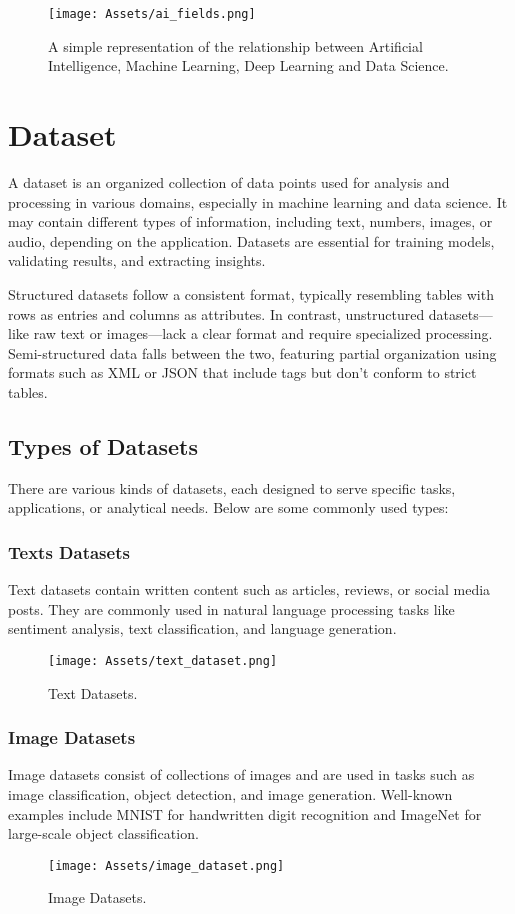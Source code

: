\begin{figure}[H]
    \centering
    \texttt{[image: Assets/ai\_fields.png]}
    \caption{A simple representation of the relationship between Artificial Intelligence, Machine Learning, Deep Learning and Data Science.}
    \label{fig:ai_fields}
\end{figure}

\section{Dataset}
A dataset is an organized collection of data points used for analysis and processing in various domains, especially in machine learning and data science. It may contain different types of information, including text, numbers, images, or audio, depending on the application. Datasets are essential for training models, validating results, and extracting insights.

Structured datasets follow a consistent format, typically resembling tables with rows as entries and columns as attributes. In contrast, unstructured datasets—like raw text or images—lack a clear format and require specialized processing. Semi-structured data falls between the two, featuring partial organization using formats such as XML or JSON that include tags but don’t conform to strict tables.
\subsection{Types of Datasets}
There are various kinds of datasets, each designed to serve specific tasks, applications, or analytical needs. Below are some commonly used types:

\subsubsection*{Texts Datasets}
Text datasets contain written content such as articles, reviews, or social media posts. They are commonly used in natural language processing tasks like sentiment analysis, text classification, and language generation. 

\begin{figure}[H]
    \centering
    \texttt{[image: Assets/text\_dataset.png]}
    \caption{Text Datasets.}
    \label{fig:text_dataset}
\end{figure}

\subsubsection*{Image Datasets}
Image datasets consist of collections of images and are used in tasks such as image classification, object detection, and image generation. Well-known examples include MNIST for handwritten digit recognition and ImageNet for large-scale object classification.
\begin{figure}[H]
    \centering
    \texttt{[image: Assets/image\_dataset.png]}
    \caption{Image Datasets.}
    \label{fig:image_dataset}
\end{figure}

